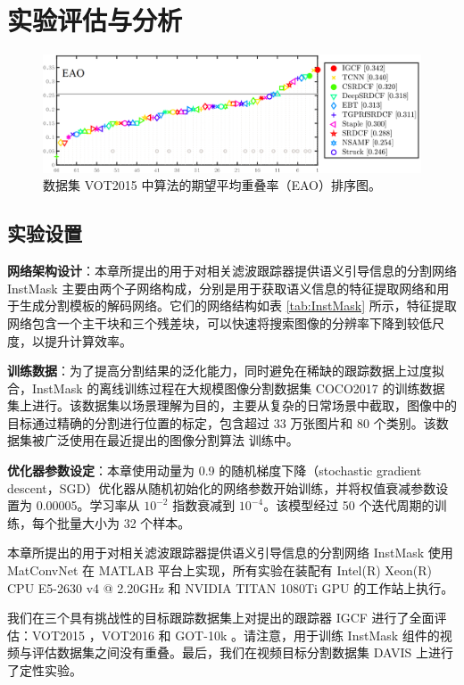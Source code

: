 \section{实验评估与分析}

\begin{figure}[t]
    \centering
    \includegraphics[width=1.0\textwidth]{Img/IGCF/vot/eao_rank_vot2015.png}
    \caption{数据集 VOT2015 \cite{Kristan2015TheVO} 中算法的期望平均重叠率（EAO）排序图。}
    \label{fig:vot15}
\end{figure}

\subsection{实验设置}
\textbf{网络架构设计}：本章所提出的用于对相关滤波跟踪器提供语义引导信息的分割网络 InstMask 主要由两个子网络构成，分别是用于获取语义信息的特征提取网络和用于生成分割模板的解码网络。它们的网络结构如表 \ref{tab:InstMask} 所示，特征提取网络包含一个主干块和三个残差块，可以快速将搜索图像的分辨率下降到较低尺度，以提升计算效率。

\textbf{训练数据}：为了提高分割结果的泛化能力，同时避免在稀缺的跟踪数据上过度拟合，InstMask 的离线训练过程在大规模图像分割数据集 COCO2017 \cite{COCO} 的训练数据集上进行。该数据集以场景理解为目的，主要从复杂的日常场景中截取，图像中的目标通过精确的分割进行位置的标定，包含超过 33 万张图片和 80 个类别。该数据集被广泛使用在最近提出的图像分割算法 \cite{He2018MaskR} 训练中。

\textbf{优化器参数设定}：本章使用动量为 0.9 的随机梯度下降（stochastic gradient descent，SGD）优化器从随机初始化的网络参数开始训练，并将权值衰减参数设置为 0.00005。学习率从 $10^{-2}$ 指数衰减到 $10^{-4}$。该模型经过 50 个迭代周期的训练，每个批量大小为 32 个样本。

本章所提出的用于对相关滤波跟踪器提供语义引导信息的分割网络 InstMask 使用 MatConvNet \cite{MatConvNet} 在 MATLAB 平台上实现，所有实验在装配有 Intel(R) Xeon(R) CPU E5-2630 v4 @ 2.20GHz 和 NVIDIA TITAN 1080Ti GPU 的工作站上执行。

我们在三个具有挑战性的目标跟踪数据集上对提出的跟踪器 IGCF 进行了全面评估：VOT2015 \cite{Kristan2015TheVO}，VOT2016 \cite{Kristan2016TheVO} 和 GOT-10k \cite{GOT-10k}。请注意，用于训练 InstMask 组件的视频与评估数据集之间没有重叠。最后，我们在视频目标分割数据集 DAVIS \cite{Perazzi2016} 上进行了定性实验。

